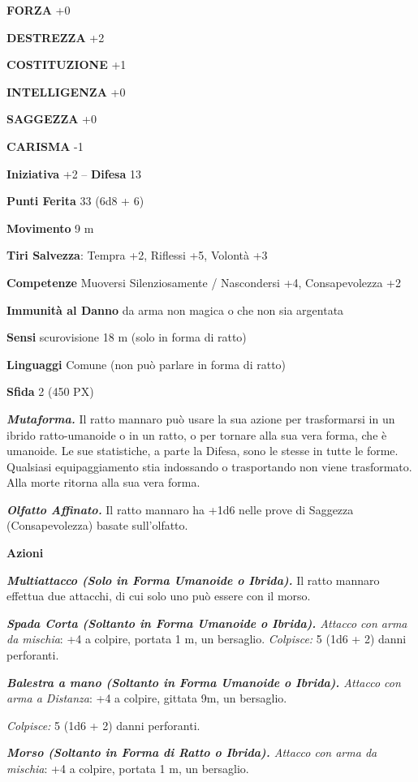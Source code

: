 \begin{multicols}{2}
	\textbf{FORZA} +0

	\textbf{DESTREZZA} +2

	\textbf{COSTITUZIONE} +1

	\textbf{INTELLIGENZA} +0

	\textbf{SAGGEZZA} +0

	\textbf{CARISMA} -1

	\textbf{Iniziativa} +2 -- \textbf{Difesa} 13

	\textbf{Punti Ferita} 33 (6d8 + 6)

	\textbf{Movimento} 9 m

	\textbf{Tiri Salvezza}: Tempra +2, Riflessi +5, Volontà +3

	\textbf{Competenze} Muoversi Silenziosamente / Nascondersi +4, Consapevolezza +2

	\textbf{Immunità al Danno} da arma non magica o che non sia argentata

	\textbf{Sensi} scurovisione 18 m (solo in forma di ratto)

	\textbf{Linguaggi} Comune (non può parlare in forma di ratto)

	\textbf{Sfida} 2 (450 PX)

	\textit{\textbf{Mutaforma.}} Il ratto mannaro può usare la sua azione per trasformarsi in un ibrido ratto-umanoide o in un ratto, o per tornare alla sua vera forma, che è umanoide. Le sue statistiche, a parte la Difesa, sono le stesse in tutte le forme. Qualsiasi equipaggiamento stia indossando o trasportando non viene trasformato. Alla morte ritorna alla sua vera forma.

	\textit{\textbf{Olfatto Affinato.}} Il ratto mannaro ha +1d6 nelle prove di Saggezza (Consapevolezza) basate sull'olfatto.

	\textbf{Azioni}

	\textit{\textbf{Multiattacco (Solo in Forma Umanoide o Ibrida).}} Il ratto mannaro effettua due attacchi, di cui solo uno può essere con il morso.

	\textit{\textbf{Spada Corta (Soltanto in Forma Umanoide o Ibrida).} Attacco con arma da mischia}: +4 a colpire, portata 1 m, un bersaglio. \textit{Colpisce:} 5 (1d6 + 2) danni perforanti.

	\textit{\textbf{Balestra a mano (Soltanto in Forma Umanoide o Ibrida).} Attacco con arma a Distanza}: +4 a colpire, gittata 9m, un bersaglio.

	\textit{Colpisce:} 5 (1d6 + 2) danni perforanti.

	\textit{\textbf{Morso (Soltanto in Forma di Ratto o Ibrida).} Attacco con arma da mischia}: +4 a colpire, portata 1 m, un bersaglio.


\end{multicols}
